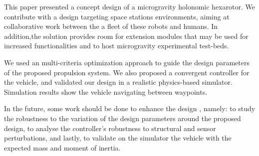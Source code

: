 
This paper presented a concept design of a microgravity holonomic hexarotor. We contribute with a design targeting space stations environments, aiming at collaborative work between the a fleet of these robots and humans. In addition,the solution provides room for extension modules that may be used for increased functionalities and to host microgravity experimental test-beds.

We used an multi-criteria optimization approach to guide the design parameters of the proposed propulsion system. We also proposed a convergent controller for the vehicle, and validated our design in a realistic physics-based simulator. Simulation results show the vehicle navigating between waypoints.

In the future, some work should be done to enhance the design , namely: to study the robustness to the variation of the design parameters around the proposed design, to analyse the controller's robustness to structural and sensor perturbations, and lastly, to validate on the simulator the vehicle with the expected mass and moment of inertia.


